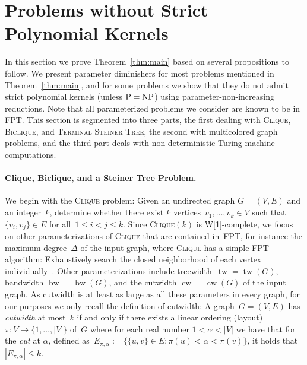 \documentclass[11pt,a4,USenglish]{article}
\newcommand{\prob}[1]{\textsc{#1}}
\newcommand{\pprob}[2]{\prob{#1}$(#2)$}
\newcommand{\NP}{\textnormal{NP}}
\newcommand{\PTIME}{\textnormal{P}}
\newcommand{\FPT}{\textnormal{FPT}}
\newcommand{\W}[1]{\textnormal{W[#1]}}
\newcommand{\PeqNP}{$\PTIME{}=\NP{}$}
\DeclareMathOperator{\tw}{tw}
\DeclareMathOperator{\bw}{bw}
\DeclareMathOperator{\cw}{cw}
\theoremstyle{definition}
\theoremstyle{plain}
\theoremstyle{remark}
\newcommand{\appendixsection}[1]{%
%
}
\begin{document}
%
%
%

%
%
%


%
%
%


\section{Problems without Strict Polynomial Kernels}
\label{sec:nopk}
\appendixsection{sec:nopk}
%
%
%

In this section we prove Theorem~\ref{thm:main} based on several propositions to follow. We present parameter diminishers for most problems mentioned in Theorem~\ref{thm:main}, and for some problems we show that they do not admit strict polynomial kernels (unless \PeqNP{}) using parameter-non-increasing reductions. Note that all parameterized problems we consider are known to be in \FPT{}. 
This section is segmented into three parts, the first dealing with
\prob{Clique}, \textsc{Biclique}, and \prob{Terminal Steiner Tree}, the second with multicolored graph problems,
and the third part deals with non-deterministic Turing machine
computations.
%
%
%
%
%
%
%
%
%
%
%

%

%
\paragraph{Clique, Biclique, and a Steiner Tree Problem.}\label{ssec:cliqedom}

We begin with the \prob{Clique} problem: Given an undirected graph $G=(V,E)$ and an integer~$k$, determine whether there exist $k$ vertices~$v_1,\ldots,v_k \in V$ such that $\{v_i,v_j\} \in E$ for all~$1\le i < j \le k$. 
%
%
%
%
%
Since \pprob{Clique}{k} is \W{1}-complete, we focus on other parameterizations of \prob{Clique} that are contained in~\FPT{}, for instance the maximum degree~$\Delta$ of the input graph, where \prob{Clique} has a simple \FPT{} algorithm\iflong{}: Exhaustively search the closed neighborhood of each vertex individually\fi{}~\cite{cygan2015parameterized}. 
Other parameterizations include treewidth~$\tw=\tw(G)$, bandwidth $\bw=\bw(G)$, and the cutwidth $\cw=\cw(G)$ of the input graph. 
As cutwidth is at least as large as all these parameters in every graph, for our purposes we only recall the definition of cutwidth: 
%
A graph~$G=(V,E)$ has \emph{cutwidth} at most~$k$ if and only if there exists a linear ordering (layout) $\pi: V \to \{1,\ldots,|V|\}$ of~$G$ where for each real number $1<\alpha<|V|$ we have that for the \emph{cut} at $\alpha$, defined as~$E_{\pi,\alpha}:=\{ \{u,v\} \in E: \pi(u) < \alpha < \pi(v)\}$, it holds that~$|E_{\pi,\alpha}| \leq k$.
\end{document}
